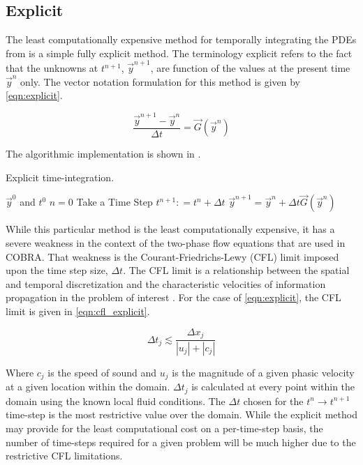 \subsection{Explicit}
\label{subsect:numerics_explicit}
The least computationally expensive method for temporally integrating the PDEs from  is a simple fully explicit method.
The terminology explicit refers to the fact that the unknowns at $t^{n+1}$, $\vec{y}^{n+1}$, are function of the values at the present time $\vec{y}^{n}$ only.
The vector notation formulation for this method is given by \eqref{eqn:explicit}. 

\begin{equation}
\label{eqn:explicit}
\frac{ \vec{y}^{n+1} - \vec{y}^{n}}{\Delta t} = \vec{G}(\vec{y}^{n})
\end{equation}

The algorithmic implementation is shown in .

\begin{algo}[H]
\caption{Explicit time-integration.}
\label{algo:explicit}
\setlength{\baselineskip}{0.625\baselineskip}
\begin{algorithmic}[1]
\Require $\vec{y}^{0}$ and $t^{0}$
\Set $n = 0$
\Loop \; Take a Time Step
    \State $t^{n+1} : = t^{n} + \Delta t$
    \Calculate $\vec{y}^{n+1} = \vec{y}^{n} + \Delta t \vec{G}(\vec{y}^n)$
\end{algorithmic}
\end{algo}

While this particular method is the least computationally expensive, it has a severe weakness in the context of the two-phase flow equations that are used in COBRA.
That weakness is the Courant-Friedrichs-Lewy (CFL) limit imposed upon the time step size, $\Delta t$.
The CFL limit is a relationship between the spatial and temporal discretization and the characteristic velocities of information propagation in the problem of interest \cite{LeVeque2007, Tannehill1997}.
For the case of \eqref{eqn:explicit}, the CFL limit is given in \eqref{eqn:cfl_explicit}.

\begin{equation}
\label{eqn:cfl_explicit}
\Delta t_j \lesssim \frac{\Delta x_j}{|u_j|+|c_j|}
\end{equation}

Where $c_j$ is the speed of sound and $u_j$ is the magnitude of a given phasic velocity at a given location within the domain.
$\Delta t_j$ is calculated at every point within the domain using the known local fluid conditions.
The $\Delta t$ chosen for the $t^{n} \rightarrow t^{n+1}$ time-step is the most restrictive value over the domain.
While the explicit method may provide for the least computational cost on a per-time-step basis, the number of time-steps required for a given problem will be much higher due to the restrictive CFL limitations.

